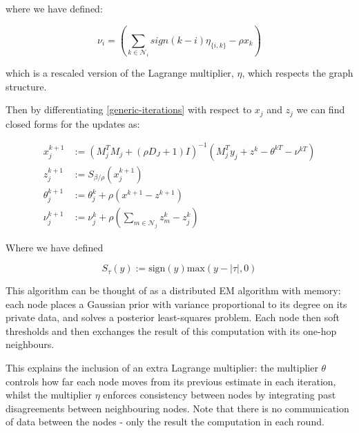 where we have defined:

\begin{equation}
\nu_i = \left(\sum_{k \in \mathcal{N}_i} sign\left(k-i\right)\eta_{\{i,k\}} - \rho x_k \right)
\end{equation}

which is a rescaled version of the Lagrange multiplier, \(\eta\), which respects the graph structure. 

Then by differentiating \eqref{generic-iterations} with respect to \(x_j\) and \(z_j\) we  can find closed forms for the updates as:

\begin{align}
x_j^{k+1} &:= \left(M_j^TM_j + (\rho D_J + 1) I\right)^{-1}\left(M_j^Ty_j +  z^k -\theta^{kT} - \nu^{kT}\right)\\
z_j^{k+1} &:= S_{\beta/\rho}\left(x_j^{k+1} \right)
 \\
\theta_j^{k+1} &:= \theta_j^{k} + \rho \left(x^{k+1}-z^{k+1}\right) \\
\nu_j^{k+1} &:= \nu_j^k + \rho\left(\sum_{m \in \mathcal{N}_j} z_m^k - z_j^k\right)
\label{dadmm_algo_lasso}
\end{align}

Where we have defined

\begin{defn}
\begin{equation}
S_{\tau}\left( y \right) := \mathrm{sign}(y)\mathrm{max}(y-|\tau|, 0)
\end{equation}
\end{defn}

\begin{remark}
This algorithm can be thought of as a distributed EM algorithm with memory: each node places a Gaussian prior with variance proportional to its degree on its private data, and solves a posterior least-squares problem. Each node then soft thresholds and then exchanges the result of this computation with its one-hop neighbours.
 
This explains the inclusion of an extra Lagrange multiplier: the multiplier \(\theta\) controls how far each node moves from its previous estimate in each iteration, whilst the multiplier \(\eta\) enforces consistency between nodes by integrating past disagreements between neighbouring nodes. Note that there is no communication of data between the nodes - only the result the computation in each round.
\end{remark}